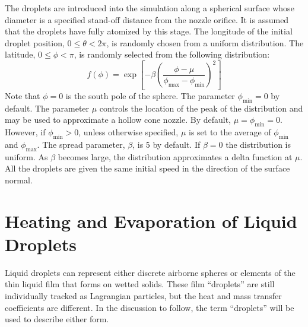 The droplets are introduced into the simulation along a spherical surface whose diameter is a specified stand-off distance from the nozzle orifice. It is assumed that the droplets have fully atomized by this stage. The longitude of the initial droplet position, $0\le \theta < 2 \pi$, is randomly chosen from a uniform distribution. The latitude, $0 \le \phi < \pi$, is randomly selected from the following distribution:
\begin{equation}
  f(\phi) = \exp \left[ - \beta \left( \frac{\phi - \mu}{\phi_{\max} - \phi_{\min}} \right)^2 \right]
\end{equation}
Note that $\phi=0$ is the south pole of the sphere. The parameter $\phi_{\min}=0$ by default. The parameter $\mu$ controls the location of the peak of the distribution and may be used to approximate a hollow cone nozzle.  By default, $\mu=\phi_{\min}=0$.  However, if $\phi_{\min}>0$, unless otherwise specified, $\mu$ is set to the average of $\phi_{\min}$ and $\phi_{\max}$.  The spread parameter, $\beta$, is 5 by default.  If $\beta=0$ the distribution is uniform.  As $\beta$ becomes large, the distribution approximates a delta function at $\mu$.  All the droplets are given the same initial speed in the direction of the surface normal.



\section{Heating and Evaporation of Liquid Droplets}

Liquid droplets can represent either discrete airborne spheres or elements of the thin liquid film that forms on wetted solids. These film ``droplets'' are still individually tracked as Lagrangian particles, but the heat and mass transfer coefficients are different. In the discussion to follow, the term ``droplets'' will be used to describe either form.

